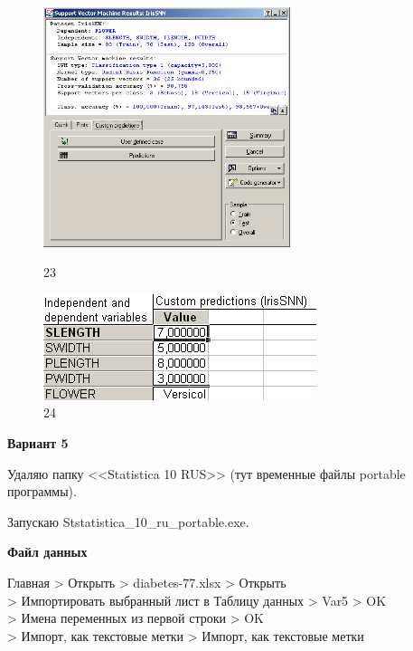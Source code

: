 \begin{figure}[!h]
  \centering

  \begin{minipage}{0.49\textwidth}
    \centering

    \includegraphics[height=7cm]
    {inc/ex_23.PNG}

    \caption{23}

    \label{fig:23}
  \end{minipage}
  \begin{minipage}{0.49\textwidth}
    \centering

    \includegraphics[width=8cm]
    {inc/ex_24.PNG}

    \caption{24}

    \label{fig:24}
  \end{minipage}
\end{figure}

\newpage

\begin{center}
  \textbf{Вариант 5}
\end{center}

Удаляю папку <<Statistica 10 RUS>> (тут временные файлы portable программы).

Запускаю Ststatistica\_10\_ru\_portable.exe.

\begin{center}
  \textbf{Файл данных}
\end{center}

Главная > Открыть > diabetes-77.xlsx > Открыть \\
> Импортировать выбранный лист в Таблицу данных > Var5 > OK \\
> Имена переменных из первой строки > OK \\
> Импорт, как текстовые метки > Импорт, как текстовые метки

